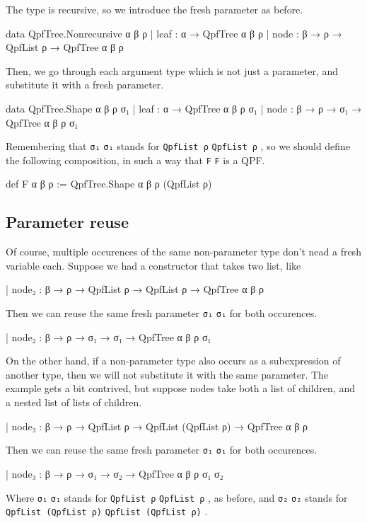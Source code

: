 \documentclass[titlepage]{report}
\newcommand\lean[1]{%
\ifx\leanmode\undefined%
\def\leanmode{1}%
\texttt{\small #1}%
\undef\leanmode%
\else%
\texttt{#1}%
\fi%
}
\begin{document}
The type is recursive, so we introduce the fresh parameter as before.
\begin{leancode}
    data QpfTree.Nonrecursive α β ρ
      | leaf : α → QpfTree α β ρ
      | node : β → ρ → QpfList ρ → QpfTree α β ρ
\end{leancode}

Then, we go through each argument type which is not just a parameter, and substitute
it with a fresh parameter.

\begin{leancode}
    data QpfTree.Shape α β ρ σ₁
      | leaf : α → QpfTree α β ρ σ₁
      | node : β → ρ → σ₁ → QpfTree α β ρ σ₁
\end{leancode}
Remembering that \lean{σ₁} stands for \lean{QpfList ρ}, so we should define the following 
composition, in such a way that \lean{F} is a QPF.
\begin{leancode}
    def F α β ρ := QpfTree.Shape α β ρ (QpfList ρ)
\end{leancode}


\subsection{Parameter reuse}
Of course, multiple occurences of the same non-parameter type don't nead a fresh variable each.
Suppose we had a constructor that takes two list, like
\begin{leancode}
    | node₂ : β → ρ → QpfList ρ → QpfList ρ → QpfTree α β ρ
\end{leancode}
Then we can reuse the same fresh parameter \lean{σ₁} for both occurences.
\begin{leancode}
    | node₂ : β → ρ → σ₁ → σ₁ → QpfTree α β ρ σ₁
\end{leancode}

On the other hand, if a non-parameter type also occurs as a subexpression of another type, then
we will not substitute it with the same parameter.
The example gets a bit contrived, but suppose nodes take both a list of children, and a nested list 
of lists of children.
\begin{leancode}
    | node₃ : β → ρ → QpfList ρ → QpfList (QpfList ρ) → QpfTree α β ρ
\end{leancode}
Then we can reuse the same fresh parameter \lean{σ₁} for both occurences.
\begin{leancode}
    | node₃ : β → ρ → σ₁ → σ₂ → QpfTree α β ρ σ₁ σ₂
\end{leancode}
Where \lean{σ₁} stands for \lean{QpfList ρ}, as before, and \lean{σ₂} stands for 
\lean{QpfList (QpfList ρ)}.
\end{document}

